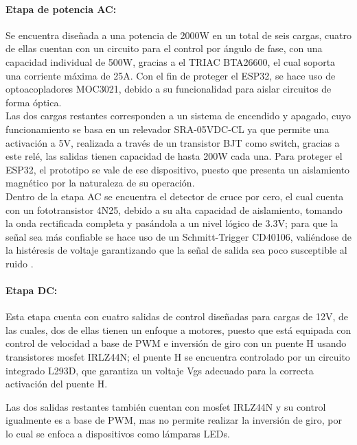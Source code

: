 	\paragraph{Etapa de potencia AC:}
		Se encuentra diseñada a una potencia de 2000W en un total de seis cargas, cuatro de ellas cuentan con un circuito para el control por ángulo de fase, con una capacidad individual de 500W, gracias a el TRIAC BTA26600, el cual soporta una corriente máxima de 25A. Con el fin de proteger el ESP32, se hace uso de optoacopladores MOC3021, debido a su funcionalidad para aislar circuitos de forma óptica.\\
	
		Las dos cargas restantes corresponden a un sistema de encendido y apagado, cuyo funcionamiento se basa en un relevador SRA-05VDC-CL ya que permite una activación a 5V, realizada a través de un transistor BJT como switch, gracias a este relé, las salidas tienen capacidad de hasta 200W cada una. Para proteger el ESP32, el prototipo se vale de ese dispositivo, puesto que presenta un aislamiento magnético por la naturaleza de su operación.\\
	
		Dentro de la etapa AC se encuentra el detector de cruce por cero, el cual cuenta con un fototransistor 4N25, debido a su alta capacidad de aislamiento, tomando la onda rectificada completa y pasándola a un nivel lógico de 3.3V; para que la señal sea más confiable se hace uso de un Schmitt-Trigger CD40106, valiéndose de la histéresis de voltaje garantizando que la señal de salida sea poco susceptible al ruido \cite{DC0}.\\
	
	\paragraph{Etapa DC:}
		Esta etapa cuenta con cuatro salidas de control diseñadas para cargas de 12V, de las cuales, dos de ellas tienen un enfoque a motores, puesto que está equipada con control de velocidad a base de PWM e inversión de giro con un puente H usando transistores mosfet IRLZ44N; el puente H se encuentra controlado por un circuito integrado L293D, que garantiza un voltaje Vgs adecuado para la correcta activación del puente H.

		Las dos salidas restantes también cuentan con mosfet IRLZ44N y su control igualmente es a base de PWM, mas no permite realizar la inversión de giro, por lo cual se enfoca a dispositivos como lámparas LEDs.
	
